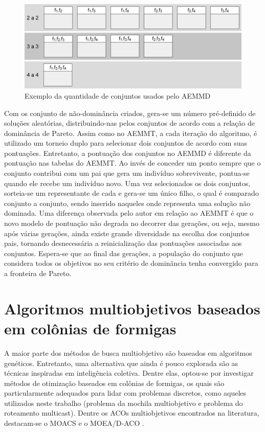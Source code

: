 \begin{figure}[!htbp]
	\label{fig_aemmd_tabelas}
	\centering
	\includegraphics[width=1\textwidth]{cap_otimizacao-multi/figs/aeemd-tabelas}
	\caption{Exemplo da quantidade de conjuntos usados pelo AEMMD}
\end{figure}

Com os conjunto de não-dominância criados, gera-se um número pré-definido de soluções aleatórias, distribuindo-nas pelos conjuntos de acordo com a relação de dominância de Pareto. Assim como no AEMMT, a cada iteração do algoritmo, é utilizado um torneio duplo para selecionar dois conjuntos de acordo com suas pontuações. Entretanto, a pontuação dos conjuntos no AEMMD é diferente da pontuação nas tabelas do AEMMT. Ao invés de conceder um ponto sempre que o conjunto contribui com um pai que gera um indivíduo sobrevivente, pontua-se quando ele recebe um indivíduo novo. Uma vez selecionados os dois conjuntos, sorteia-se um representante de cada e gera-se um único filho, o qual é comparado conjunto a conjunto, sendo inserido naqueles onde representa uma solução não dominada. Uma diferença observada pelo autor em relação ao AEMMT é que o novo modelo de pontuação não degrada no decorrer das gerações, ou seja, mesmo após várias gerações, ainda existe grande diversidade na escolha dos conjuntos pais, tornando desnecessária a reinicialização das pontuações associadas aos conjuntos. Espera-se que ao final das gerações, a população do conjunto que considera todos os objetivos no seu critério de dominância tenha convergido para a fronteira de Pareto. 

\section{Algoritmos multiobjetivos baseados em colônias de formigas}

A maior parte dos métodos de busca multiobjetivo são baseados em algoritmos genéticos. Entretanto, uma alternativa que ainda é pouco explorada são as técnicas inspiradas em inteligência coletiva. Dentre elas, optou-se por investigar métodos de otimização baseados em colônias de formigas, os quais são particularmente adequados para lidar com problemas discretos, como aqueles utilizados neste trabalho (problema da mochila multiobjetivo e problema do roteamento multicast). Dentre os ACOs multiobjetivos encontrados na literatura, destacam-se o MOACS \cite{Baran2003} e o MOEA/D-ACO \cite{Ke2013}.

